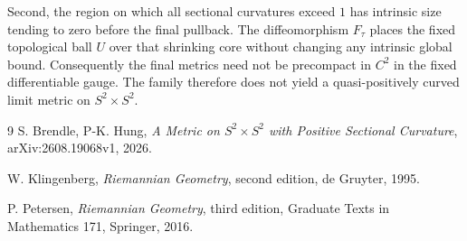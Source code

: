 \documentclass[11pt]{amsart}
\theoremstyle{definition}
\begin{document}
Second, the region on which all sectional curvatures exceed $1$ has intrinsic size tending to zero before the final pullback.  The diffeomorphism $F_\tau$ places the fixed topological ball $U$ over that shrinking core without changing any intrinsic global bound.  Consequently the final metrics need not be precompact in $C^2$ in the fixed differentiable gauge.  The family therefore does not yield a quasi-positively curved limit metric on $S^2\times S^2$.

\begin{thebibliography}{9}
 S. Brendle, P-K. Hung, \emph{A Metric on $S^2\times S^2$ with Positive Sectional Curvature}, arXiv:2608.19068v1, 2026.

W. Klingenberg,
\emph{Riemannian Geometry},
second edition, de Gruyter, 1995.

P. Petersen,
\emph{Riemannian Geometry},
third edition, Graduate Texts in Mathematics 171,
Springer, 2016.

\end{thebibliography}
\end{document}
